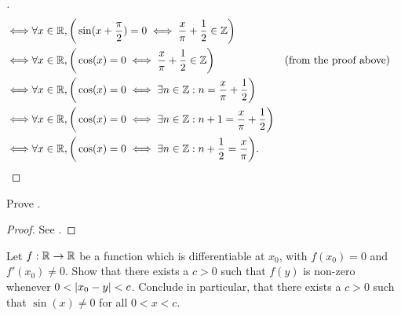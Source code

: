 \begin{proof}[]
\begin{align*}
    \iff & \forall x \in \mathbb{R}, \bigg(\sin(x + \dfrac{\pi}{2}) = 0 \iff \dfrac{x}{\pi} + \dfrac{1}{2} \in \mathbb{Z}\bigg)                                       \\
    \iff & \forall x \in \mathbb{R}, \bigg(\cos(x) = 0 \iff \dfrac{x}{\pi} + \dfrac{1}{2} \in \mathbb{Z}\bigg)                     &  & \text{(from the proof above)} \\
    \iff & \forall x \in \mathbb{R}, \bigg(\cos(x) = 0 \iff \exists n \in \mathbb{Z} : n = \dfrac{x}{\pi} + \dfrac{1}{2}\bigg)                                        \\
    \iff & \forall x \in \mathbb{R}, \bigg(\cos(x) = 0 \iff \exists n \in \mathbb{Z} : n + 1 = \dfrac{x}{\pi} + \dfrac{1}{2}\bigg)                                    \\
    \iff & \forall x \in \mathbb{R}, \bigg(\cos(x) = 0 \iff \exists n \in \mathbb{Z} : n + \dfrac{1}{2} = \dfrac{x}{\pi}\bigg).
  \end{align*}
\end{proof}

\exercisesection

\begin{ex}\label{ii:ex:4.7.1}
  Prove .
\end{ex}

\begin{proof}
  See .
\end{proof}

\begin{ex}\label{ii:ex:4.7.2}
  Let \(f : \mathbb{R} \to \mathbb{R}\) be a function which is differentiable at \(x_0\), with \(f(x_0) = 0\) and \(f'(x_0) \neq 0\).
  Show that there exists a \(c > 0\) such that \(f(y)\) is non-zero whenever \(0 < \left\lvert x_0 - y\right\rvert < c\).
  Conclude in particular, that there exists a \(c > 0\) such that \(\sin(x) \neq 0\) for all \(0 < x < c\).
\end{ex}

